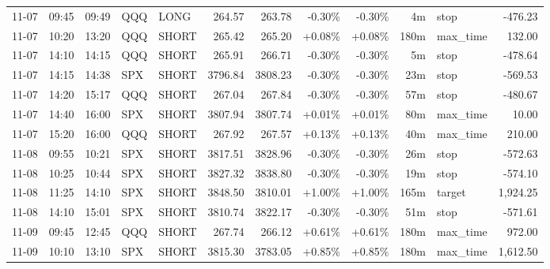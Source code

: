 \documentclass[11pt,a4paper,twoside]{article}
\begin{document}
\begin{center}
\begin{longtable}{>{\color{txtmain}}l l l l l r r r r r >{\color{txtmain}}l r}
11-07 & 09:45 & 09:49 & QQQ & LONG & 264.57 & 263.78 & \textcolor{lossred}{-0.30\%} & \textcolor{lossred}{-0.30\%} & 4m & stop & \textcolor{lossred}{-476.23} \\
11-07 & 10:20 & 13:20 & QQQ & SHORT & 265.42 & 265.20 & \textcolor{wingreen}{+0.08\%} & \textcolor{wingreen}{+0.08\%} & 180m & max\_time & \textcolor{wingreen}{132.00} \\
11-07 & 14:10 & 14:15 & QQQ & SHORT & 265.91 & 266.71 & \textcolor{lossred}{-0.30\%} & \textcolor{lossred}{-0.30\%} & 5m & stop & \textcolor{lossred}{-478.64} \\
11-07 & 14:15 & 14:38 & SPX & SHORT & 3796.84 & 3808.23 & \textcolor{lossred}{-0.30\%} & \textcolor{lossred}{-0.30\%} & 23m & stop & \textcolor{lossred}{-569.53} \\
11-07 & 14:20 & 15:17 & QQQ & SHORT & 267.04 & 267.84 & \textcolor{lossred}{-0.30\%} & \textcolor{lossred}{-0.30\%} & 57m & stop & \textcolor{lossred}{-480.67} \\
11-07 & 14:40 & 16:00 & SPX & SHORT & 3807.94 & 3807.74 & \textcolor{wingreen}{+0.01\%} & \textcolor{wingreen}{+0.01\%} & 80m & max\_time & \textcolor{wingreen}{10.00} \\
11-07 & 15:20 & 16:00 & QQQ & SHORT & 267.92 & 267.57 & \textcolor{wingreen}{+0.13\%} & \textcolor{wingreen}{+0.13\%} & 40m & max\_time & \textcolor{wingreen}{210.00} \\
11-08 & 09:55 & 10:21 & SPX & SHORT & 3817.51 & 3828.96 & \textcolor{lossred}{-0.30\%} & \textcolor{lossred}{-0.30\%} & 26m & stop & \textcolor{lossred}{-572.63} \\
11-08 & 10:25 & 10:44 & SPX & SHORT & 3827.32 & 3838.80 & \textcolor{lossred}{-0.30\%} & \textcolor{lossred}{-0.30\%} & 19m & stop & \textcolor{lossred}{-574.10} \\
11-08 & 11:25 & 14:10 & SPX & SHORT & 3848.50 & 3810.01 & \textcolor{wingreen}{+1.00\%} & \textcolor{wingreen}{+1.00\%} & 165m & target & \textcolor{wingreen}{1,924.25} \\
11-08 & 14:10 & 15:01 & SPX & SHORT & 3810.74 & 3822.17 & \textcolor{lossred}{-0.30\%} & \textcolor{lossred}{-0.30\%} & 51m & stop & \textcolor{lossred}{-571.61} \\
11-09 & 09:45 & 12:45 & QQQ & SHORT & 267.74 & 266.12 & \textcolor{wingreen}{+0.61\%} & \textcolor{wingreen}{+0.61\%} & 180m & max\_time & \textcolor{wingreen}{972.00} \\
11-09 & 10:10 & 13:10 & SPX & SHORT & 3815.30 & 3783.05 & \textcolor{wingreen}{+0.85\%} & \textcolor{wingreen}{+0.85\%} & 180m & max\_time & \textcolor{wingreen}{1,612.50} \\

\end{longtable}
\end{center}
\end{document}
